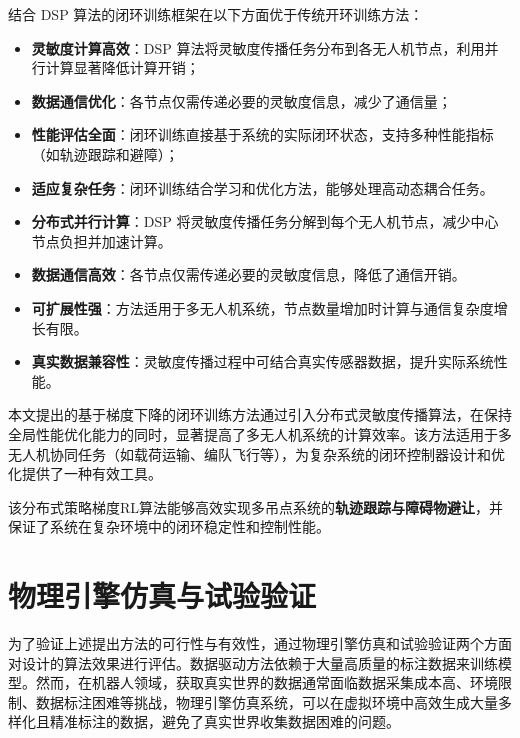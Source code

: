 \documentclass[lang=chs, degree=master, blindreview=false, winfonts=true]{yanputhesis}
\begin{document}
结合 DSP 算法的闭环训练框架在以下方面优于传统开环训练方法：
\begin{itemize}
    \item \textbf{灵敏度计算高效}：DSP 算法将灵敏度传播任务分布到各无人机节点，利用并行计算显著降低计算开销；
    \item \textbf{数据通信优化}：各节点仅需传递必要的灵敏度信息，减少了通信量；
    \item \textbf{性能评估全面}：闭环训练直接基于系统的实际闭环状态，支持多种性能指标（如轨迹跟踪和避障）；
    \item \textbf{适应复杂任务}：闭环训练结合学习和优化方法，能够处理高动态耦合任务。
\end{itemize}

\begin{itemize}
    \item \textbf{分布式并行计算}：DSP 将灵敏度传播任务分解到每个无人机节点，减少中心节点负担并加速计算。
    \item \textbf{数据通信高效}：各节点仅需传递必要的灵敏度信息，降低了通信开销。
    \item \textbf{可扩展性强}：方法适用于多无人机系统，节点数量增加时计算与通信复杂度增长有限。
    \item \textbf{真实数据兼容性}：灵敏度传播过程中可结合真实传感器数据，提升实际系统性能。
\end{itemize}

本文提出的基于梯度下降的闭环训练方法通过引入分布式灵敏度传播算法，在保持全局性能优化能力的同时，显著提高了多无人机系统的计算效率。该方法适用于多无人机协同任务（如载荷运输、编队飞行等），为复杂系统的闭环控制器设计和优化提供了一种有效工具。


该分布式策略梯度RL算法能够高效实现多吊点系统的\textbf{轨迹跟踪与障碍物避让}，并保证了系统在复杂环境中的闭环稳定性和控制性能。

\cleardoublepage

\chapter{物理引擎仿真与试验验证}
为了验证上述提出方法的可行性与有效性，通过物理引擎仿真和试验验证两个方面对设计的算法效果进行评估。数据驱动方法依赖于大量高质量的标注数据来训练模型。然而，在机器人领域，获取真实世界的数据通常面临数据采集成本高、环境限制、数据标注困难等挑战，物理引擎仿真系统，可以在虚拟环境中高效生成大量多样化且精准标注的数据，避免了真实世界收集数据困难的问题。
\end{document}

